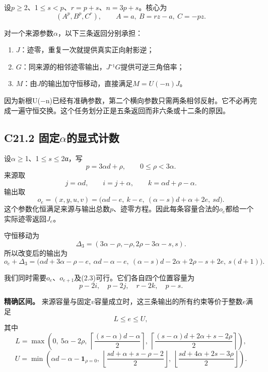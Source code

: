 {设\ensuremath{p}\ensuremath{\ge}2、1\ensuremath{\le}\ensuremath{s<p}、\ensuremath{r=p+s}、\ensuremath{n=3p+s}。核心为} \[
(A^p,B^p,C^r),\qquad A=a,\ B=rz-a,\ C=-pz.
\]

{对一个来源参数\ensuremath{\alpha }，以下三条返回分别承担：}

\begin{enumerate}
\def\labelenumi{\arabic{enumi}.}
\tightlist
\item
  {\ensuremath{J}：迹零，重复一次就提供真实正向射影逆；}
\item
  {\ensuremath{G}：同来源的相邻迹零输出，\ensuremath{J}⁻¹\ensuremath{G}提供可逆三角倍率；}
\item
  {\ensuremath{M}：由\ensuremath{J}的输出加守恒移动，直接满足\ensuremath{M=U(-n)J}。}
\end{enumerate}

{因为新根U(−n)已经有准确参数，第二个横向参数只需两条相邻反射。它不必再完成一遍守恒交换。这个任务划分正是五条返回而非六条或十二条的原因。}

\subsection*{\texorpdfstring{{C21.2} {固定\ensuremath{\alpha }的显式计数}}{C21.2 固定的显式计数}}\label{C21-h141}

{设\ensuremath{\alpha }\ensuremath{\ge}1、1\ensuremath{\le}\ensuremath{s}\ensuremath{\le}2α，写} \[
p=3\alpha d+\rho,\qquad 0\le\rho<3\alpha.
\] {来源取} \[
j=\alpha d,\qquad i=j+\alpha,\qquad
k=\alpha d+\rho-\alpha.
\tag{C21.2.1}
\] {输出取} \[
o_e=(x,y,u,v)=
\bigl(\alpha d-e,\ k-e,\ (\alpha-s)d+\alpha+2e,\ sd\bigr).
\tag{C21.2.2}
\] {这个参数化恒满足来源与输出总数\ensuremath{p}、迹零方程。因此每条容量合法的\ensuremath{o_{e}}都给一个实际迹零返回\ensuremath{J_{e}}。}

{守恒移动为} \[
\Delta_3=(3\alpha-\rho,-\rho,2\rho-3\alpha-s,s).
\] {所以改变后的输出为} \[
o_e+\Delta_3=
\bigl(\alpha d+3\alpha-\rho-e,\ \alpha d-\alpha-e,\
(\alpha-s)d-2\alpha+2\rho-s+2e,\ s(d+1)\bigr).
\tag{C21.2.3}
\]

{我们同时需要\ensuremath{o_{e}}、\ensuremath{o_{e+1}}及(2.3)可行。它们各自四个位置容量为} \[
p-2i,\quad p-2j,\quad r-2k,\quad p-s.
\tag{C21.2.4}
\]

\textbf{{精确区间。}} {来源容量与固定\ensuremath{v}容量成立时，这三条输出的所有约束等价于整数\ensuremath{e}满足} \[
L\le e\le U,
\] {其中} \[
\boxed{
L=\max\left(
0,\ 5\alpha-2\rho,\
\left\lceil\frac{(s-\alpha)d-\alpha}{2}\right\rceil,\
\left\lceil\frac{(s-\alpha)d+2\alpha+s-2\rho}{2}\right\rceil
\right),
}
\tag{C21.2.5}
\] \[
\boxed{
U=\min\left(
\alpha d-\alpha-\mathbf1_{\rho=0},\
\left\lfloor\frac{sd+\alpha+s-\rho-2}{2}\right\rfloor,\
\left\lfloor\frac{sd+4\alpha+2s-3\rho}{2}\right\rfloor
\right).
}
\tag{C21.2.6}
\]


